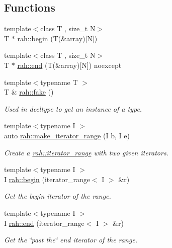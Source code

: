 \subsection*{Functions}
\begin{DoxyCompactItemize}
\item 
{\footnotesize template$<$class T , size\+\_\+t N$>$ }\\T $\ast$ \mbox{\hyperlink{namespacerah_acccec48f25fb1a805854818f05d7b616}{rah\+::begin}} (T(\&array)\mbox{[}N\mbox{]})
\item 
{\footnotesize template$<$class T , size\+\_\+t N$>$ }\\T $\ast$ \mbox{\hyperlink{namespacerah_a20a3e45aee90bb5534a00c6b14e06069}{rah\+::end}} (T(\&array)\mbox{[}N\mbox{]}) noexcept
\item 
{\footnotesize template$<$typename T $>$ }\\T \& \mbox{\hyperlink{namespacerah_aa659f5ae02cb923cd8813f96cfd86a25}{rah\+::fake}} ()
\begin{DoxyCompactList}\small\item\em Used in decltype to get an instance of a type. \end{DoxyCompactList}\item 
{\footnotesize template$<$typename I $>$ }\\auto \mbox{\hyperlink{namespacerah_a0a3dd43bb465c99137bfdebb2292b102}{rah\+::make\+\_\+iterator\+\_\+range}} (I b, I e)
\begin{DoxyCompactList}\small\item\em Create a \mbox{\hyperlink{structrah_1_1iterator__range}{rah\+::iterator\+\_\+range}} with two given iterators. \end{DoxyCompactList}\item 
{\footnotesize template$<$typename I $>$ }\\I \mbox{\hyperlink{namespacerah_a2c4a19e57cc4e0753e93830f247def6d}{rah\+::begin}} (iterator\+\_\+range$<$ I $>$ \&r)
\begin{DoxyCompactList}\small\item\em Get the begin iterator of the range. \end{DoxyCompactList}\item 
{\footnotesize template$<$typename I $>$ }\\I \mbox{\hyperlink{namespacerah_aaddd1442cd76b96876e692cdefe7261d}{rah\+::end}} (iterator\+\_\+range$<$ I $>$ \&r)
\begin{DoxyCompactList}\small\item\em Get the \char`\"{}past the\char`\"{} end iterator of the range. \end{DoxyCompactList}\item 

\end{DoxyCompactItemize}
